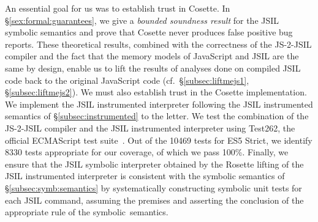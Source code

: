 \documentclass[sigconf, review]{acmart}
\newcommand{\jsil}{JSIL\xspace}
\newcommand{\JSComp}{JS-2-JSIL\xspace}
\newcommand{\polish}[1]{{\color{red}#1}}
\newcommand{\cosette}{Cosette\xspace}
\newcommand{\pgmaxinline}[1]{ {\color{purple} *** PG : #1 ***} }
\begin{document}










An essential goal for us was to establish trust in Cosette. In
\S\ref{sex:formal:guarantees}, we give a {\em bounded soundness
  result} for the \jsil symbolic semantics and prove that \cosette
never produces false positive bug reports. These theoretical results,
combined with the correctness of the \JSComp compiler
and the fact that the memory models of JavaScript and \jsil are the
same by design, enable us to lift the results of analyses done on
compiled \jsil code back to the original JavaScript code
(cf.~\S\ref{subsec:liftmejs1}, \S\ref{subsec:liftmejs2}). We must also
establish trust in the Cosette implementation. 
We  implement the \jsil  instrumented interpreter following the \jsil 
instrumented semantics of \S\ref{subsec:instrumented} to the letter.
We test the combination of the 
JS-2-JSIL compiler and the \jsil instrumented  interpreter using Test262, 
the official ECMAScript test suite~\cite{test262}. Out of the
10469 tests for ES5 Strict, we identify 8330 tests appropriate
for our coverage, of which we pass 100\%.
Finally, we ensure that the \jsil symbolic interpreter obtained by the 
Rosette lifting of the \jsil instrumented interpreter is consistent 
with the symbolic semantics of \S\ref{subsec:symb:semantics}
by systematically constructing symbolic unit tests for each \jsil command,
assuming the premises and asserting the conclusion of the 
appropriate rule of the symbolic~semantics. 





\end{document}

